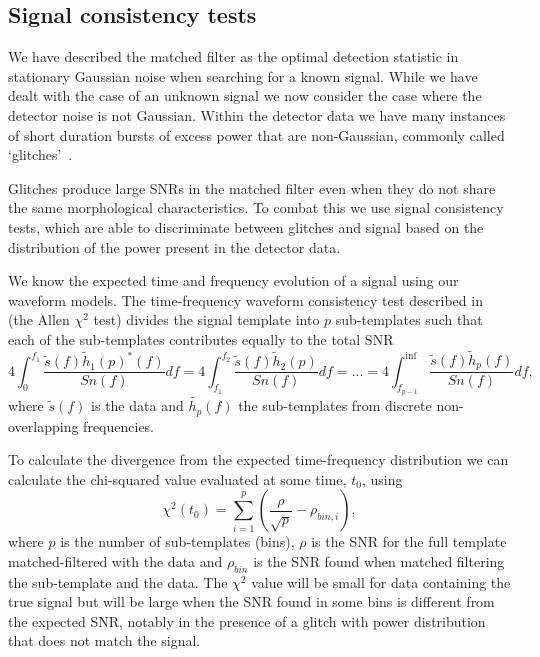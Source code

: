 \subsection{\label{2:sec:signal-consistency}Signal consistency tests}

We have described the matched filter as the optimal detection statistic in stationary Gaussian noise when searching for a known signal. While we have dealt with the case of an unknown signal we now consider the case where the detector noise is not Gaussian. Within the detector data we have many instances of short duration bursts of excess power that are non-Gaussian, commonly called `glitches'~\cite{LIGO_data_quality:2015}.

Glitches produce large SNRs in the matched filter even when they do not share the same morphological characteristics. To combat this we use signal consistency tests, which are able to discriminate between glitches and signal based on the distribution of the power present in the detector data.

We know the expected time and frequency evolution of a \gwadj signal using our waveform models. The time-frequency waveform consistency test described in~\cite{Allen_Chi:2005} (the Allen $\chi^{2}$ test) divides the signal template into $p$ sub-templates such that each of the sub-templates contributes equally to the total SNR
%
\begin{equation}
    4 \int^{f_{1}}_{0}\frac{\tilde{s}(f) \tilde{h}_{1}(p)^*(f)}{Sn(f)}df = 4 \int^{f_{2}}_{f_{1}}\frac{\tilde{s}(f) \tilde{h}_{2}(p)}{Sn(f)}df = ... =  4 \int^{\inf}_{f_{p-1}}\frac{\tilde{s}(f) \tilde{h}_{p}(f)}{Sn(f)}df ,
\end{equation}
%
where $\tilde{s}(f)$ is the data and $\tilde{h_{p}}(f)$ the sub-templates from discrete non-overlapping frequencies.

To calculate the divergence from the expected time-frequency distribution we can calculate the chi-squared value evaluated at some time, $t_{0}$, using
%
\begin{equation}
    \chi^{2}(t_{0}) = \sum^{p}_{i=1} \left(\frac{\rho}{\sqrt{p}} - \rho_{bin, i}\right),
\end{equation}
%
where $p$ is the number of sub-templates (bins), $\rho$ is the SNR for the full template matched-filtered with the data and $\rho_{bin}$ is the SNR found when matched filtering the sub-template and the data. The $\chi^{2}$ value will be small for data containing the true signal but will be large when the SNR found in some bins is different from the expected SNR, notably in the presence of a glitch with power distribution that does not match the signal.

